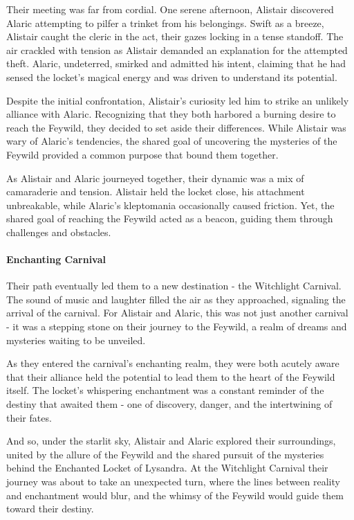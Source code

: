 \documentclass[letterpaper,openany,oneside,twocolumn]{book}
\begin{document}
{Their meeting was far from cordial. One serene afternoon, Alistair discovered Alaric attempting to pilfer a trinket from his belongings. Swift as a breeze, Alistair caught the cleric in the act, their gazes locking in a tense standoff. The air crackled with tension as Alistair demanded an explanation for the attempted theft. Alaric, undeterred, smirked and admitted his intent, claiming that he had sensed the locket's magical energy and was driven to understand its potential.

Despite the initial confrontation, Alistair's curiosity led him to strike an unlikely alliance with Alaric. Recognizing that they both harbored a burning desire to reach the Feywild, they decided to set aside their differences. While Alistair was wary of Alaric's tendencies, the shared goal of uncovering the mysteries of the Feywild provided a common purpose that bound them together.

As Alistair and Alaric journeyed together, their dynamic was a mix of camaraderie and tension. Alistair held the locket close, his attachment unbreakable, while Alaric's kleptomania occasionally caused friction. Yet, the shared goal of reaching the Feywild acted as a beacon, guiding them through challenges and obstacles.

\eject

\paragraph*{Enchanting Carnival} Their path eventually led them to a new destination - the Witchlight Carnival. The sound of music and laughter filled the air as they approached, signaling the arrival of the carnival. For Alistair and Alaric, this was not just another carnival - it was a stepping stone on their journey to the Feywild, a realm of dreams and mysteries waiting to be unveiled.

As they entered the carnival's enchanting realm, they were both acutely aware that their alliance held the potential to lead them to the heart of the Feywild itself. The locket's whispering enchantment was a constant reminder of the destiny that awaited them - one of discovery, danger, and the intertwining of their fates.

And so, under the starlit sky, Alistair and Alaric explored their surroundings, united by the allure of the Feywild and the shared pursuit of the mysteries behind the Enchanted Locket of Lysandra. At the Witchlight Carnival their journey was about to take an unexpected turn, where the lines between reality and enchantment would blur, and the whimsy of the Feywild would guide them toward their destiny.
}
\end{document}
